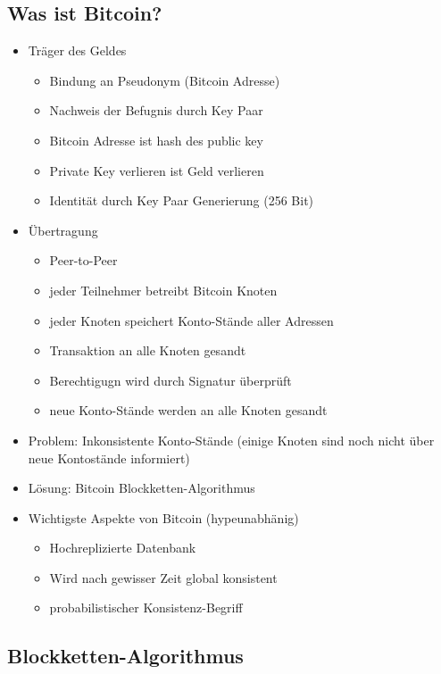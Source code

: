 \documentclass{article} %
\begin{document}
	\subsection{Was ist Bitcoin?}
	\begin{itemize}
		\item Träger des Geldes
		\begin{itemize}
			\item Bindung an Pseudonym (Bitcoin Adresse)
			\item Nachweis der Befugnis durch Key Paar
			\item Bitcoin Adresse ist hash des public key
			\item Private Key verlieren ist Geld verlieren
			\item Identität durch Key Paar Generierung (256 Bit)
		\end{itemize}
		\item Übertragung
		\begin{itemize}
			\item Peer-to-Peer
			\item jeder Teilnehmer betreibt Bitcoin Knoten
			\item jeder Knoten speichert Konto-Stände aller Adressen
			\item Transaktion an alle Knoten gesandt
			\item Berechtigugn wird durch Signatur überprüft
			\item neue Konto-Stände werden an alle Knoten gesandt
		\end{itemize}
		\item Problem: Inkonsistente Konto-Stände (einige Knoten sind noch nicht über neue Kontostände informiert)
		\item Lösung: Bitcoin Blockketten-Algorithmus
		\item Wichtigste Aspekte von Bitcoin (hypeunabhänig)
			\begin{itemize}
				\item Hochreplizierte Datenbank
				\item Wird nach gewisser Zeit global konsistent
				\item probabilistischer Konsistenz-Begriff
			\end{itemize}
	\end{itemize}
	\subsection{Blockketten-Algorithmus}
\end{document}
